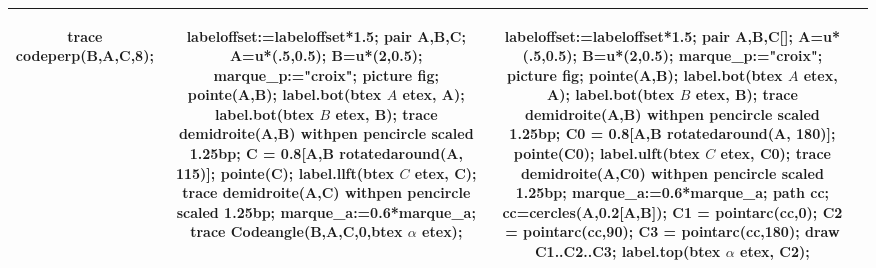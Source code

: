 \begin{changemargin}{0mm}{-20mm}
\begin{definition}[Classement des angles selon leur mesure $\alpha=\widehat{BAC}$]
\begin{center}
{\begin{tabular}{|*4{c|}}
\begin{Geometrie}[CoinHD={(2.5u,2u)}]
                trace codeperp(B,A,C,8);
            \end{Geometrie}
            &
            \begin{Geometrie}[CoinBG={(-u,0)},CoinHD={(2.5u,2u)}]            
                labeloffset:=labeloffset*1.5;
                pair A,B,C;
                A=u*(.5,0.5);
                B=u*(2,0.5);
                marque_p:="croix";
                picture fig;
                pointe(A,B);
                label.bot(btex $A$ etex, A);
                label.bot(btex $B$ etex, B);
                trace demidroite(A,B) withpen pencircle scaled 1.25bp;
                C = 0.8[A,B rotatedaround(A, 115)];
                pointe(C);
                label.llft(btex $C$ etex, C);
                trace demidroite(A,C) withpen pencircle scaled 1.25bp;
                marque_a:=0.6*marque_a;
                trace Codeangle(B,A,C,0,btex $\alpha$ etex);
            \end{Geometrie}
            &
            \begin{Geometrie}[CoinBG={(-u,0)},CoinHD={(2.5u,2u)}]
                labeloffset:=labeloffset*1.5;            
                pair A,B,C[];
                A=u*(.5,0.5);
                B=u*(2,0.5);
                marque_p:="croix";
                picture fig;
                pointe(A,B);
                label.bot(btex $A$ etex, A);
                label.bot(btex $B$ etex, B);
                trace demidroite(A,B) withpen pencircle scaled 1.25bp;
                C0 = 0.8[A,B rotatedaround(A, 180)];
                pointe(C0);
                label.ulft(btex $C$ etex, C0);
                trace demidroite(A,C0) withpen pencircle scaled 1.25bp;
                marque_a:=0.6*marque_a;
                path cc;
                cc=cercles(A,0.2[A,B]);
                C1 = pointarc(cc,0);
                C2 = pointarc(cc,90);
                C3 = pointarc(cc,180);
                draw C1..C2..C3;
                label.top(btex $\alpha$ etex, C2);
            \end{Geometrie}\\\hline        
        \end{tabular}    
        }


\end{center}
\end{definition}
\end{changemargin}
